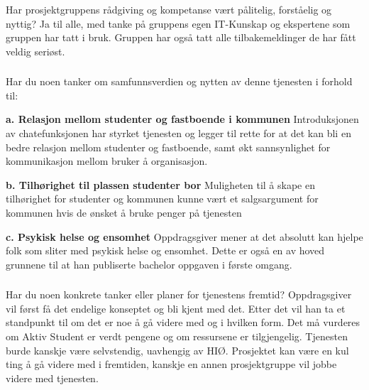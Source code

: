 \subsubsection{}{Har prosjektgruppens rådgiving og kompetanse vært pålitelig, forståelig og nyttig?}
Ja til alle, med tanke på gruppens egen IT-Kunskap og ekspertene som gruppen har tatt i bruk. Gruppen har også tatt alle tilbakemeldinger de har fått veldig seriøst.

\subsubsection{}{Har du noen tanker om samfunnsverdien og nytten av denne tjenesten i forhold til:}

{\bf a. Relasjon mellom studenter og fastboende i kommunen}
Introduksjonen av chatefunksjonen har styrket tjenesten og legger til rette for at det kan bli en bedre relasjon mellom studenter og fastboende, samt økt sannsynlighet for kommunikasjon mellom bruker å organisasjon.

{\bf b. Tilhørighet til plassen studenter bor}
Muligheten til å skape en tilhørighet for studenter og kommunen kunne vært et salgsargument for kommunen hvis de ønsket å bruke penger på tjenesten

{\bf c. Psykisk helse og ensomhet}
Oppdragsgiver mener at det absolutt kan hjelpe folk som sliter med psykisk helse og ensomhet. Dette er også en av hoved grunnene til at han publiserte bachelor oppgaven i første omgang.

\subsubsection{}{Har du noen konkrete tanker eller planer for tjenestens fremtid?}
Oppdragsgiver vil først få det endelige konseptet og bli kjent med det. Etter det vil han ta et standpunkt til om det er noe å gå videre med og i hvilken form. Det må vurderes om Aktiv Student er verdt pengene og om ressursene er tilgjengelig. Tjenesten burde kanskje være selvstendig, uavhengig av HIØ. Prosjektet kan være en kul ting å gå videre med i fremtiden, kanskje en annen prosjektgruppe vil jobbe videre med tjenesten.



